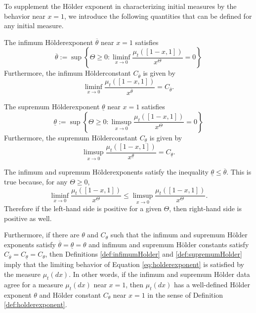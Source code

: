 \documentclass[11pt]{article}
\numberwithin{equation}{section}
\newcommand{\ds}{\displaystyle}
\newcommand{\holder}{H{\"o}lder\:}
\begin{document}
{To supplement the H{\"o}lder exponent in characterizing initial measures by the behavior near $x=1$, we introduce the following quantities that can be defined for any initial measure. 

\begin{definition} \label{def:infimumHolder}
The infimum \holder exponent $\overline{\theta}$ near $x=1$ satisfies \begin{equation} \label{eq:infholderexponent} \overline{\theta} := \sup \left\{ \Theta \geq 0: \ds\liminf_{x \to 0}\frac{\mu_t([1-x,1])}{x^{\Theta}} = 0 \right\} \end{equation} 
Furthermore, the infimum \holder constant $C_{\overline{\theta}}$ is given by
\begin{equation}
    \ds\liminf_{x \to 0} \frac{\mu_t([1-x,1])}{x^{\overline{\theta}}} = C_{\overline{\theta}}.
\end{equation}
\end{definition}
%
%
\begin{definition} \label{def:supremumHolder}
The supremum \holder exponent $\underline{\theta}$ near $x=1$ satisfies \begin{equation} \label{eq:supholderexponent} \underline{\theta} := \sup \left\{ \Theta \geq 0: \ds\limsup_{x \to 0}\frac{\mu_t([1-x,1])}{x^{\Theta}} = 0 \right\} \end{equation} 
Furthermore, the supremum \holder constant $C_{\underline{\theta}}$ is given by
\begin{equation}
    \ds\limsup_{x \to 0} \frac{\mu_t([1-x,1])}{x^{\underline{\theta}}} = C_{\underline{\theta}}.
\end{equation}
\end{definition}
\begin{remark}
The infimum and supremum \holder exponents satisfy the inequality $\underline{\theta} \leq \overline{\theta}$. This is true because, for any $\Theta \geq 0$, \begin{equation} \label{eq:liminfleqlimsup} \liminf_{x \to 0} \frac{\mu_t\left(\left[1-x,1\right] \right)}{x^{\Theta}} \leq \limsup_{x \to 0} \frac{\mu_t\left(\left[1-x,1\right] \right)}{x^{\Theta}}.\end{equation} Therefore if the left-hand side is positive for a given $\Theta$, then right-hand side is positive as well. 

Furthermore, if there are $\theta$ and $C_{\theta}$ such that the infimum and supremum H{\"o}lder exponents satisfy $\overline{\theta} = \underline{\theta} = \theta$ and infimum and supremum H{\"o}lder constants satisfy $C_{\overline{\theta}} = C_{\underline{\theta}} = C_{\theta}$, then Definitions \ref{def:infimumHolder} and \ref{def:supremumHolder} imply that the limiting behavior of Equation \eqref{eq:holderexponent} is satisfied by the measure $\mu_t(dx)$. In other words, if the infimum and supremum H{\"o}lder data agree for a measure $\mu_t(dx)$ near $x=1$, then $\mu_t(dx)$ has a well-defined H{\"o}lder exponent $\theta$ and H{\"o}lder constant $C_{\theta}$ near $x=1$ in the sense of Definition \ref{def:holderexponent}. 
\end{remark}

}
\end{document}
